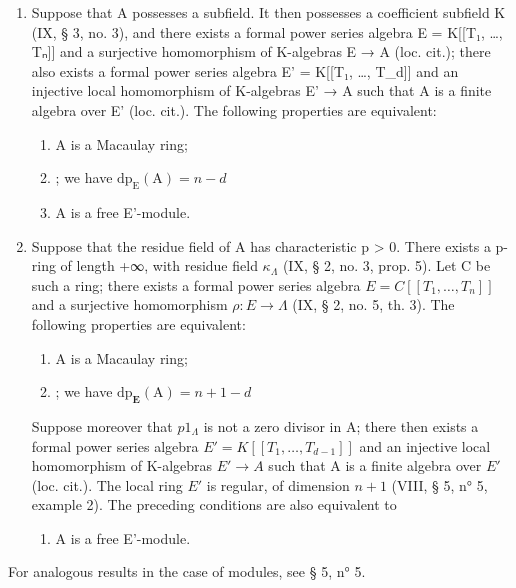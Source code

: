 \begin{enumerate}
\def\labelenumi{\alph{enumi})}
\tightlist
\item
  Suppose that A possesses a subfield. It then possesses a coefficient subfield K (IX, § 3, no. 3), and there exists a formal power series algebra E = K{[}{[}T₁, \ldots, Tₙ{]}{]} and a surjective homomorphism of K-algebras E → A (loc. cit.); there also exists a formal power series algebra E' = K{[}{[}T₁, \ldots, T\_d{]}{]} and an injective local homomorphism of K-algebras E' → A such that A is a finite algebra over E' (loc. cit.). The following properties are equivalent:
  \begin{enumerate}
  \def\labelenumii{(\roman{enumii})}
  \item
    A is a Macaulay ring;
  \item
    ; we have \(\mathrm{dp}_{\mathrm{E}}(\mathrm{A}) = n - d\)
  \item
    A is a free E'-module.
  \end{enumerate}

\item
  Suppose that the residue field of A has characteristic p \textgreater{} 0. There exists a p-ring of length +∞, with residue field \(\kappa_{\Lambda}\) (IX, § 2, no. 3, prop. 5). Let C be such a ring; there exists a formal power series algebra \(E = C[[T_{1}, \ldots, T_{n}]]\) and a surjective homomorphism \(\rho : E \to \Lambda\) (IX, § 2, no. 5, th. 3). The following properties are equivalent:
  \begin{enumerate}
  \def\labelenumii{(\roman{enumii})}
  \item
    A is a Macaulay ring;
  \item
    ; we have \(\mathrm{dp}_{\mathbf{E}}(\mathrm{A}) = n + 1 - d\)
  \end{enumerate}

Suppose moreover that \(p1_{\Lambda}\) is not a zero divisor in A; there then exists a formal power series algebra \(E' = K[[T_1, \ldots, T_{d-1}]]\) and an injective local homomorphism of K-algebras \(E' \to A\) such that A is a finite algebra over \(E'\) (loc. cit.). The local ring \(E'\) is regular, of dimension \(n+1\) (VIII, § 5, n° 5, example 2). The preceding conditions are also equivalent to

  \begin{enumerate}
  \def\labelenumii{(\roman{enumii})}
  \setcounter{enumii}{2}
  \tightlist
  \item
    A is a free E'-module.
  \end{enumerate}
\end{enumerate}

For analogous results in the case of modules, see § 5, n° 5.


